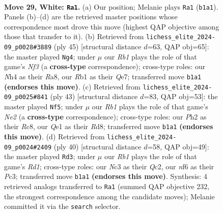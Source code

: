 \documentclass[11pt]{article}
\begin{document}
\clearpage

\begin{figure}[p]\centering
\begin{subfigure}{0.46\textwidth}\centering
\resizebox{\linewidth}{!}{%
\newchessgame
\chessboard[
  setfen={1n1r2k1/4q1p1/rp1ppn2/4p2p/P3P2N/2N3P1/2P2P1P/1RR1Q1K1 w - - 2 29},
  showmover=false,
  pgfstyle=straightmove, color=movearrow, markmove={b1-a1}
]}
\caption{}
\end{subfigure}\hfill
\begin{subfigure}{0.46\textwidth}\centering
\resizebox{\linewidth}{!}{%
\newchessgame
\chessboard[
  setfen={r3r1k1/pp2qpp1/2pp1n1p/8/1PPRP3/P1N1Q3/5PPP/1R4K1 b - - 6 23},
  showmover=false,
  pgfstyle=straightmove, color=movearrow, markmove={f6-g4}
]}
\caption{}
\end{subfigure}
\\[4pt]
\begin{subfigure}{0.46\textwidth}\centering
\resizebox{\linewidth}{!}{%
\newchessgame
\chessboard[
  setfen={2rr2k1/1p2npp1/pq5p/3n4/1P1PN3/P4N1P/4RPP1/RQ4K1 b - - 0 22},
  showmover=false,
  pgfstyle=straightmove, color=movearrow, markmove={e7-f5}
]}
\caption{}
\end{subfigure}\hfill
\begin{subfigure}{0.46\textwidth}\centering
\resizebox{\linewidth}{!}{%
\newchessgame
\chessboard[
  setfen={3r2k1/1pq2pp1/p3rn1p/2pp4/8/2P1PN1P/PPQ2PP1/R2R2K1 w - - 6 21},
  showmover=false,
  pgfstyle=straightmove, color=movearrow, markmove={d1-d3}
]}
\caption{}
\end{subfigure}
\caption{\textbf{Move 29, White: \texttt{Ra1}.} (a) Our position; Melanie plays \texttt{Ra1} (\texttt{b1a1}). Panels (b)--(d) are the retrieved master positions whose correspondence most drove this move (highest QAP objective among those that transfer to it). (b) Retrieved from \texttt{lichess\_elite\_2024-09\_p0028\#3889} (ply 45) [structural distance $d$=63, QAP obj=65]: the master played \texttt{Ng4}; under $\mu$ our \emph{Rb1} plays the role of that game's \emph{Nf3} (a \textbf{cross-type} correspondence); cross-type roles: our \emph{N}h4 as their \emph{R}a8, our \emph{R}b1 as their \emph{Q}e7; transferred move \texttt{b1a1} \textbf{(endorses this move)}. (c) Retrieved from \texttt{lichess\_elite\_2024-09\_p0025\#841} (ply 43) [structural distance $d$=83, QAP obj=53]: the master played \texttt{Nf5}; under $\mu$ our \emph{Rb1} plays the role of that game's \emph{Ne2} (a \textbf{cross-type} correspondence); cross-type roles: our \emph{P}h2 as their \emph{R}c8, our \emph{Q}e1 as their \emph{R}d8; transferred move \texttt{b1a1} \textbf{(endorses this move)}. (d) Retrieved from \texttt{lichess\_elite\_2024-09\_p0024\#2409} (ply 40) [structural distance $d$=58, QAP obj=49]: the master played \texttt{Rd3}; under $\mu$ our \emph{Rb1} plays the role of that game's \emph{Rd1}; cross-type roles: our \emph{N}c3 as their \emph{Q}c2, our \emph{n}f6 as their \emph{P}c3; transferred move \texttt{b1a1} \textbf{(endorses this move)}. Synthesis: 4 retrieved analogs transferred to \texttt{Ra1} (summed QAP objective 232, the strongest correspondence among the candidate moves); Melanie committed it via the \texttt{search} selector.}
\label{fig:thought-m56}
\end{figure}
\end{document}
